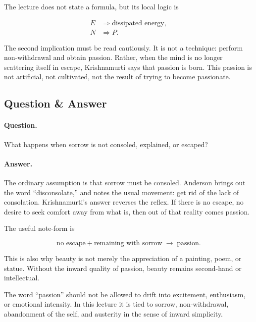 The lecture does not state a formula, but its local logic is

\begin{align}
E &\Rightarrow \text{dissipated energy},\\
N &\Rightarrow P.
\end{align}

The second implication must be read cautiously. It is not a technique: perform non-withdrawal and obtain passion. Rather, when the mind is no longer scattering itself in escape, Krishnamurti says that passion is born. This passion is not artificial, not cultivated, not the result of trying to become passionate.

\subsection{Question \& Answer}

\paragraph{Question.}
What happens when sorrow is not consoled, explained, or escaped?

\paragraph{Answer.}
The ordinary assumption is that sorrow must be consoled. Anderson brings out the word ``disconsolate,'' and notes the usual movement: get rid of the lack of consolation. Krishnamurti's answer reverses the reflex. If there is no escape, no desire to seek comfort away from what is, then out of that reality comes passion.

The useful note-form is

\begin{equation}
\text{no escape} + \text{remaining with sorrow}
\;\longrightarrow\;
\text{passion}.
\end{equation}

This is also why beauty is not merely the appreciation of a painting, poem, or statue. Without the inward quality of passion, beauty remains second-hand or intellectual.

\begin{remark}
The word ``passion'' should not be allowed to drift into excitement, enthusiasm, or emotional intensity. In this lecture it is tied to sorrow, non-withdrawal, abandonment of the self, and austerity in the sense of inward simplicity.
\end{remark}

